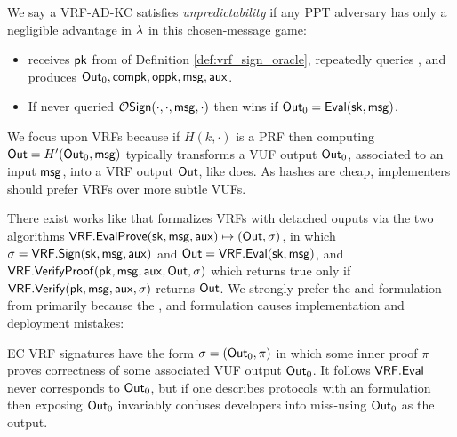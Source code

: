 \begin{definition}
We say a VRF-AD-KC satisfies {\em unpredictability} if 
any PPT adversary \adv has only a negligible advantage in $\lambda$
in this chosen-message game:
\begin{itemize}
 \item \adv receives $\mathsf{pk}$ from  of Definition \ref{def:vrf_sign_oracle},
  repeatedly queries , and produces ${\mathsf{Out}}_0,\mathsf{compk},\mathsf{oppk},\mathsf{msg},\mathsf{aux}$.
 \item If \adv never queried $\mathcal{O}\mathsf{Sign}(\cdot,\cdot,\mathsf{msg},\cdot)$ then
  \adv wins if ${\mathsf{Out}}_0 = {\mathsf{Eval}}(\mathsf{sk},\mathsf{msg})$.
\end{itemize}
\end{definition}

We focus upon VRFs because
if $H(k,\cdot)$ is a PRF then computing ${\mathsf{Out}} = H'({\mathsf{Out}}_0, \mathsf{msg})$
typically transforms a VUF output ${\mathsf{Out}}_0$, associated to an input $\mathsf{msg}$,
into a VRF output ${\mathsf{Out}}$, like \cite[Proposition 1]{vrf_micali} does.
As hashes are cheap, implementers should prefer VRFs over more subtle VUFs.



There exist works like \cite[\S3.2 $\fvrf$]{praos} that formalizes VRFs with detached ouputs via the two algorithms
${\mathsf{VRF}}.{\mathsf{EvalProve}}(\mathsf{sk},\mathsf{msg},\mathsf{aux}) \mapsto ({\mathsf{Out}},\sigma)$, in which $\sigma = {\mathsf{VRF}}.{\mathsf{Sign}}(\mathsf{sk},\mathsf{msg},\mathsf{aux})$ and ${\mathsf{Out}} = {\mathsf{VRF}}.{\mathsf{Eval}}(\mathsf{sk},\mathsf{msg})$, and
${\mathsf{VRF}}.{\mathsf{VerifyProof}}(\mathsf{pk},\mathsf{msg},\mathsf{aux},{\mathsf{Out}},\sigma)$ which returns true only if ${\mathsf{VRF}}.{\mathsf{Verify}}(\mathsf{pk},\mathsf{msg},\mathsf{aux},\sigma)$ returns ${\mathsf{Out}}$.
We strongly prefer the \Sign and \Verify formulation from \cite{agg_dkg}
primarily because the , and 
formulation causes implementation and deployment mistakes:

EC VRF signatures have the form $\sigma = ({\mathsf{Out}}_0,\pi)$ in which some
inner proof $\pi$ proves correctness of some associated VUF output ${\mathsf{Out}}_0$. %
It follows ${\mathsf{VRF}}.{\mathsf{Eval}}$ never corresponds to ${\mathsf{Out}}_0$, but if one describes
protocols with an  formulation then exposing ${\mathsf{Out}}_0$
invariably confuses developers into miss-using ${\mathsf{Out}}_0$ as the output.

